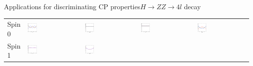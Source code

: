 \documentclass[usenames,dvipsnames,svgnames,table]{beamer}
\begin{document}
\begin{frame}{Applications for discriminating CP properties}{$H\to ZZ\to 4l$ decay}
\begin{tabular}{m{}m{}m{}m{}m{}}
\footnotesize\centering Spin 0 &
\noindent\includegraphics[width=0.18\textwidth]{onthespinandparity/phi_125GeV_spin0} &
\noindent\includegraphics[width=0.18\textwidth]{onthespinandparity/costhetastar_125GeV_spin0} &
\noindent\includegraphics[width=0.18\textwidth]{onthespinandparity/phistar1_125GeV_spin0} &
\noindent\includegraphics[width=0.18\textwidth]{onthespinandparity/costheta1_125GeV_spin0} \\
\footnotesize\centering Spin 1 &
\noindent\includegraphics[width=0.18\textwidth]{onthespinandparity/phi_125GeV_spin1} &
\noindent\includegraphics[width=0.18\textwidth]{onthespinandparity/costhetastar_125GeV_spin1} &

\end{tabular}
\end{frame}
\end{document}
